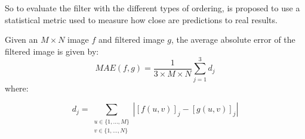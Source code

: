 

So to evaluate the filter with the different types of ordering, is proposed to use a statistical metric used to measure how close are predictions to real results\cite{willmott2005advantages}.

Given an $M \times N$ image $f$ and filtered image $g$, the average absolute error of the filtered image is given by:
\begin{equation}
\label{MAE}
MAE(f,g) = \frac{1}{3\times M\times N}\sum_{j=1}^3 d_j
\end{equation} where: 


\begin{equation}
d_j = \sum_{\substack{u\in \{1, ..., M\}\\ v \in \{1, ..., N\}}} |[f(u,v)]_{j} - [g(u,v)]_{j}| 
\end{equation}



